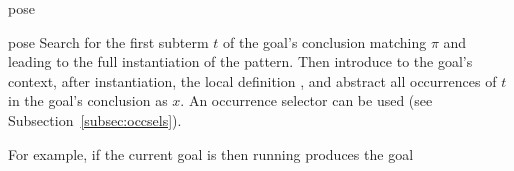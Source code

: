 \begin{tactic}[pose $\;x\!$ := $\;\pi$]{pose}
  \begin{tsyntax}[empty]{pose}
    Search for the first subterm $t$ of the goal's conclusion matching
    $\pi$ and leading to the full instantiation of the pattern. Then
    introduce to the goal's context, after instantiation, the local
    definition , and abstract all occurrences of $t$
    in the goal's conclusion as $x$. An occurrence selector can be used
    (see Subsection~\ref{subsec:occsels}).

  For example, if the current goal is
   then
  running 
  produces the goal
  \end{tsyntax}
\end{tactic}
